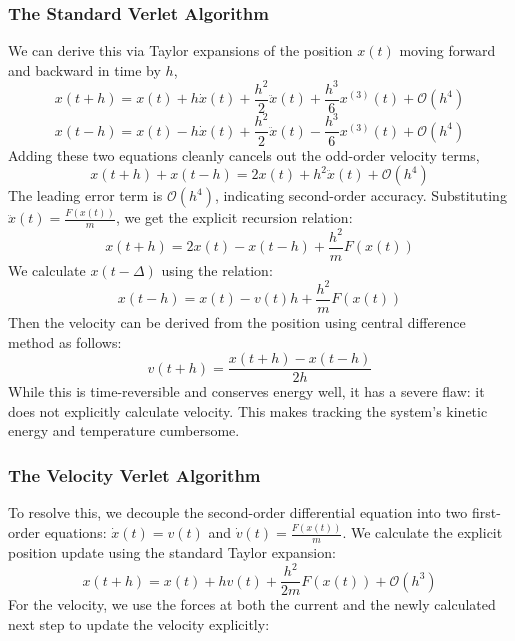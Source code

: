 \documentclass[12pt, a4paper, oneside]{article}
\begin{document}
            \subsubsection{The Standard Verlet Algorithm}
            We can derive this via Taylor expansions of the position $x(t)$ moving forward and backward in time by $h$,
            $$x(t+h) = x(t) + h\dot{x}(t) + \frac{h^2}{2}\ddot{x}(t) + \frac{h^3}{6}x^{(3)}(t) + \mathcal{O}(h^4)$$
            $$x(t-h) = x(t) - h\dot{x}(t) + \frac{h^2}{2}\ddot{x}(t) - \frac{h^3}{6}x^{(3)}(t) + \mathcal{O}(h^4)$$
            Adding these two equations cleanly cancels out the odd-order velocity terms,
            $$x(t+h) + x(t-h) = 2x(t) + h^2\ddot{x}(t) + \mathcal{O}(h^4)$$
            The leading error term is $\mathcal{O}(h^4)$, indicating second-order accuracy. Substituting $\ddot{x}(t) = \frac{F(x(t))}{m}$, we get the explicit recursion relation:
            \begin{equation}
                \label{eq5: Position verlet (position)}
                x(t + h) = 2x(t) - x(t - h) + \frac{h^2}{m}F(x(t))
            \end{equation}
            We calculate $x(t - \Delta)$ using the relation:
            \begin{equation}
                \label{eq6: Position verlet (Previous position)}
                x(t - h) = x(t) - v(t) h + \frac{h^2}{m}F(x(t))
            \end{equation}
            Then the velocity can be derived from the position using central difference method as follows:
            \begin{equation}
                \label{eq7: Position verlet (derived velocity)}
                v(t + h) = \frac{x(t + h) - x(t - h)}{2 h}
            \end{equation}
            While this is time-reversible and conserves energy well, it has a severe flaw: it does not explicitly calculate velocity. This makes tracking the system's kinetic energy and temperature cumbersome.

            \subsubsection{The Velocity Verlet Algorithm}
            To resolve this, we decouple the second-order differential equation into two first-order equations: $\dot{x}(t) = v(t)$ and $\dot{v}(t) = \frac{F(x(t))}{m}$.
            We calculate the explicit position update using the standard Taylor expansion:
            \begin{equation}
                \label{eq8: Velocity verlet (Position Update)}
                x(t+h) = x(t) + hv(t) + \frac{h^2}{2m} F(x(t)) + \mathcal{O}(h^3)
            \end{equation}
            For the velocity, we use the forces at both the current and the newly calculated next step to update the velocity explicitly:
            
\end{document}
